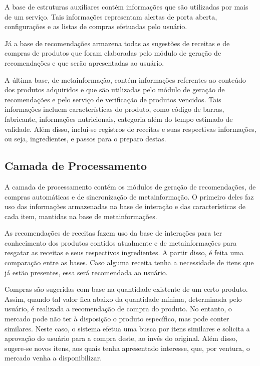 A base de estruturas auxiliares contém informações que são utilizadas por mais de um serviço. Tais informações representam alertas de porta aberta, configurações e as listas de compras efetuadas pelo usuário. 

Já a base de recomendações armazena todas as sugestões de receitas e de compras de produtos que foram elaboradas pelo módulo de geração de recomendações e que serão apresentadas ao usuário.

A última base, de metainformação, contém informações referentes ao conteúdo dos produtos adquiridos e que são utilizadas pelo módulo de geração de recomendações e pelo serviço de verificação de produtos vencidos. Tais informações incluem características do produto, como código de barras, fabricante, informações nutricionais, categoria além do tempo estimado de validade. Além disso, inclui-se registros de receitas e suas respectivas informações, ou seja, ingredientes, e passos para o preparo destas.

\subsection{Camada de Processamento}

A camada de processamento contém os módulos de geração de recomendações, de compras automáticas e de sincronização de metainformação. O primeiro deles faz uso das informações armazenadas na base de interação e das características de cada item, mantidas na base de metainformações.

As recomendações de receitas fazem uso da base de interações para ter conhecimento dos produtos contidos atualmente e de metainformações para resgatar as receitas e seus respectivos ingredientes. A partir disso, é feita uma comparação entre as bases. Caso alguma receita tenha a necessidade de itens que já estão presentes, essa será recomendada ao usuário. %

Compras são sugeridas com base na quantidade existente de um certo produto. Assim, quando tal valor fica abaixo da quantidade mínima, determinada pelo usuário, é realizada a recomendação de compra do produto. No entanto, o mercado pode não ter à disposição o produto específico, mas pode conter similares. Neste caso, o sistema efetua uma busca por itens similares e solicita a aprovação do usuário para a compra deste, ao invés do original. Além disso, sugere-se novos itens, aos quais tenha apresentado interesse, que, por ventura, o mercado venha a disponibilizar.

